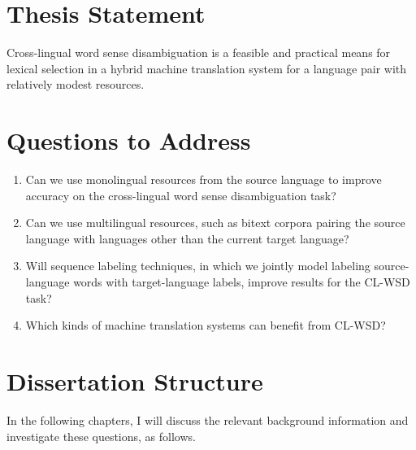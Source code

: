\section{Thesis Statement}
Cross-lingual word sense disambiguation is a feasible and practical
means for lexical selection in a hybrid machine translation system for a
language pair with relatively modest resources.

\section{Questions to Address}
\begin{enumerate}
\item Can we use monolingual resources from the source language to improve
accuracy on the cross-lingual word sense disambiguation task?
\item Can we use multilingual resources, such as bitext corpora pairing the
source language with languages other than the current target language?
\item Will sequence labeling techniques, in which we jointly model labeling
source-language words with target-language labels, improve results for the
CL-WSD task?
\item Which kinds of machine translation systems can benefit from CL-WSD?
\end{enumerate}

\section{Dissertation Structure}
In the following chapters, I will discuss the relevant background information
and investigate these questions, as follows.

